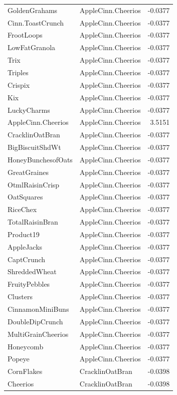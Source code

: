 \begin{longtable}{llr}
GoldenGrahams & AppleCinn.Cheerios & -0.0377 \\
Cinn.ToastCrunch & AppleCinn.Cheerios & -0.0377 \\
FrootLoops & AppleCinn.Cheerios & -0.0377 \\
LowFatGranola & AppleCinn.Cheerios & -0.0377 \\
Trix & AppleCinn.Cheerios & -0.0377 \\
Triples & AppleCinn.Cheerios & -0.0377 \\
Crispix & AppleCinn.Cheerios & -0.0377 \\
Kix & AppleCinn.Cheerios & -0.0377 \\
LuckyCharms & AppleCinn.Cheerios & -0.0377 \\
AppleCinn.Cheerios & AppleCinn.Cheerios & 3.5151 \\
CracklinOatBran & AppleCinn.Cheerios & -0.0377 \\
BigBiscuitShdWt & AppleCinn.Cheerios & -0.0377 \\
HoneyBunchesofOats & AppleCinn.Cheerios & -0.0377 \\
GreatGraines & AppleCinn.Cheerios & -0.0377 \\
OtmlRaisinCrisp & AppleCinn.Cheerios & -0.0377 \\
OatSquares & AppleCinn.Cheerios & -0.0377 \\
RiceChex & AppleCinn.Cheerios & -0.0377 \\
TotalRaisinBran & AppleCinn.Cheerios & -0.0377 \\
Product19 & AppleCinn.Cheerios & -0.0377 \\
AppleJacks & AppleCinn.Cheerios & -0.0377 \\
CaptCrunch & AppleCinn.Cheerios & -0.0377 \\
ShreddedWheat & AppleCinn.Cheerios & -0.0377 \\
FruityPebbles & AppleCinn.Cheerios & -0.0377 \\
Clusters & AppleCinn.Cheerios & -0.0377 \\
CinnamonMiniBuns & AppleCinn.Cheerios & -0.0377 \\
DoubleDipCrunch & AppleCinn.Cheerios & -0.0377 \\
MultiGrainCheerios & AppleCinn.Cheerios & -0.0377 \\
Honeycomb & AppleCinn.Cheerios & -0.0377 \\
Popeye & AppleCinn.Cheerios & -0.0377 \\
CornFlakes & CracklinOatBran & -0.0398 \\
Cheerios & CracklinOatBran & -0.0398 \\

\end{longtable}
